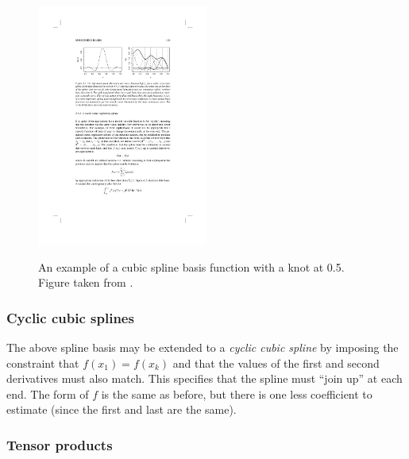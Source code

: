 \begin{figure}[tb]
\centering
\includegraphics[width=0.5\textwidth]{intro/figs/cubic.pdf}\\
\caption{An example of a cubic spline basis function with a knot at 0.5. Figure taken from .}
\label{cs-basis}
\end{figure}

\subsubsection{Cyclic cubic splines}

The above spline basis may be extended to a \textit{cyclic cubic spline} by imposing the constraint that $f(x_1)=f(x_k)$ and that the values of the first and second derivatives must also match. This specifies that the spline must ``join up'' at each end. The form of $f$ is the same as before, but there is one less coefficient to estimate (since the first and last are the same).

\subsubsection{Tensor products}
\label{GAMtensor}

